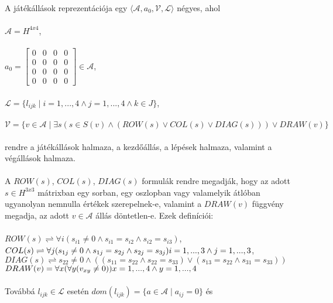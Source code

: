 \documentclass[fleqn]{article}
\begin{document}
\\\\
\\
A játékállások reprezentációja egy $\langle\mathcal{A},  a_0, \mathcal{V}, \mathcal{L}\rangle$ négyes, ahol\\\\
$\mathcal{A} = H^{4x4}$, \\\\
$a_0 = \begin{bmatrix} 0 & 0 & 0 & 0 \\ 0 & 0 & 0 & 0 \\0 & 0 & 0 & 0 \\0 & 0 & 0 & 0 \end{bmatrix} \in \mathcal{A}$, \\\\
$\mathcal{L} = \{ l_{ijk} \mid i = 1, ..., 4 \wedge j = 1, ..., 4 \wedge k \in J \}$, \\\\
$\mathcal{V} = \{ v \in \mathcal{A} \mid \exists{s}(s \in S(v) \wedge (ROW(s) \vee COL(s) \vee DIAG(s))) \vee DRAW(v) \}$\\\\
rendre a játékállások halmaza, a kezdőállás, a lépések halmaza, valamint a végállások halmaza.
\\\\
A $ROW(s)$, $COL(s)$, $DIAG(s)$ formulák rendre megadják, hogy az adott $s \in H^{3x3}$ mátrixban egy sorban, egy oszlopban vagy valamelyik átlóban ugyanolyan nemnulla értékek szerepelnek-e, valamint a $DRAW(v)$ függvény megadja, az adott $v \in \mathcal{A}$ állás döntetlen-e. Ezek definíciói:\\\\
$ROW(s) \rightleftharpoons \forall{i}(s_{i1} \neq 0 \wedge s_{i1} = s_{i2} \wedge s_{i2} = s_{i3})$,\\
$COL(s) \rightleftharpoons \forall{j}(s_{1j} \neq 0 \wedge s_{1j} = s_{2j} \wedge s_{2j} = s_{3j}) \hfill  i = 1, ..., 3 \wedge j = 1, ..., 3$,\\
$DIAG(s) \rightleftharpoons s_{22} \neq 0 \wedge ((s_{11} = s_{22} \wedge s_{22} = s_{33}) \vee (s_{13} = s_{22} \wedge s_{31} = s_{33})) $\\
$DRAW(v) = \forall{x}(\forall{y}(v_{xy} \neq 0)) \hfill x = 1, ..., 4 \wedge y = 1, ..., 4$\\
\\
Továbbá $l_{ijk} \in \mathcal{L}$ esetén $dom(l_{ijk}) = \{ a \in \mathcal{A} \mid a_{ij} = 0\}$ és\\\\
\end{document}
